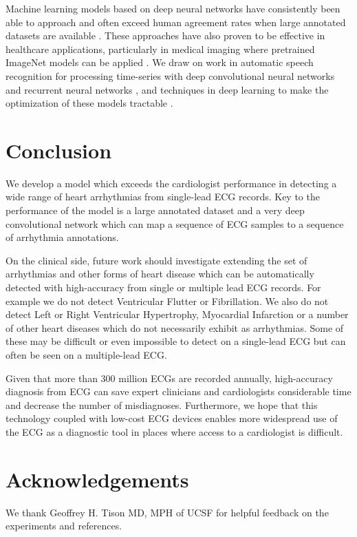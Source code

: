 \documentclass{article}
\begin{document}
Machine learning models based on deep neural networks have consistently been able to approach and often exceed human agreement rates when large annotated datasets are available \cite{amodei2016deep, xiong2016achieving,he2015delving}. These approaches have also proven to be effective in healthcare applications, particularly in medical imaging where pretrained ImageNet models can be applied \cite{esteva2017dermatologist, gulshan2016development}. We draw on work in automatic speech recognition for processing time-series with deep convolutional neural networks and recurrent neural networks \cite{Hannun2014deepspeech, sainath2013deep}, and techniques in deep learning to make the optimization of these models tractable \cite{he2016deep, he2016identity, ioffe2015batch}.



\section{Conclusion}
\label{conclusion}
We develop a model which exceeds the cardiologist performance in detecting a wide range of heart arrhythmias from single-lead ECG records. Key to the performance of the model is a large annotated dataset and a very deep convolutional network which can map a sequence of ECG samples to a sequence of arrhythmia annotations. 

On the clinical side, future work should investigate extending the set of arrhythmias and other forms of heart disease which can be automatically detected with high-accuracy from single or multiple lead ECG records. For example we do not detect Ventricular Flutter or Fibrillation. We also do not detect Left or Right Ventricular Hypertrophy, Myocardial Infarction or a number of other heart diseases which do not necessarily exhibit as arrhythmias. Some of these may be difficult or even impossible to detect on a single-lead ECG but can often be seen on a multiple-lead ECG.

Given that more than 300 million ECGs are recorded annually, high-accuracy diagnosis from ECG can save expert clinicians and cardiologists considerable time and decrease the number of misdiagnoses. Furthermore, we hope that this technology coupled with low-cost ECG devices enables more widespread use of the ECG as a diagnostic tool in places where access to a cardiologist is difficult.

\section*{Acknowledgements}
We thank Geoffrey H. Tison MD, MPH of UCSF for helpful feedback on the experiments and references.
\end{document}
